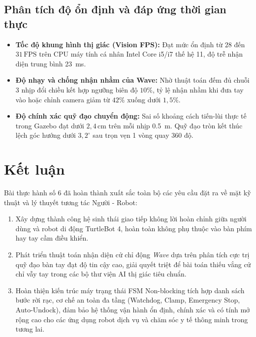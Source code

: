 \subsection{Phân tích độ ổn định và đáp ứng thời gian thực}
\begin{itemize}
    \item \textbf{Tốc độ khung hình thị giác (Vision FPS):} Đạt mức ổn định từ $28$ đến $31\,\text{FPS}$ trên CPU máy tính cá nhân Intel Core i5/i7 thế hệ 11, độ trễ nhận diện trung bình \SI{23}{\milli\second}.
    \item \textbf{Độ nhạy và chống nhận nhầm của Wave:} Nhờ thuật toán đếm đủ chuỗi 3 nhịp đổi chiều kết hợp ngưỡng biên độ $10\%$, tỷ lệ nhận nhầm khi đưa tay vào hoặc chỉnh camera giảm từ $42\%$ xuống dưới $1{,}5\%$.
    \item \textbf{Độ chính xác quỹ đạo chuyển động:} Sai số khoảng cách tiến-lùi thực tế trong Gazebo đạt dưới $2{,}4\,\text{cm}$ trên mỗi nhịp \SI{0.5}{\meter}. Quỹ đạo tròn kết thúc lệch góc hướng dưới $3{,}2^\circ$ sau trọn vẹn 1 vòng quay 360 độ.
\end{itemize}

\section{Kết luận}

Bài thực hành số 6 đã hoàn thành xuất sắc toàn bộ các yêu cầu đặt ra về mặt kỹ thuật và lý thuyết tương tác Người - Robot:
\begin{enumerate}
    \item Xây dựng thành công hệ sinh thái giao tiếp không lời hoàn chỉnh giữa người dùng và robot di động TurtleBot 4, hoàn toàn không phụ thuộc vào bàn phím hay tay cầm điều khiển.
    \item Phát triển thuật toán nhận diện cử chỉ động \textit{Wave} dựa trên phân tích cực trị quỹ đạo bàn tay đạt độ tin cậy cao, giải quyết triệt để bài toán thiếu vắng cử chỉ vẫy tay trong các bộ thư viện AI thị giác tiêu chuẩn.
    \item Hoàn thiện kiến trúc máy trạng thái FSM Non-blocking tích hợp danh sách bước rời rạc, cơ chế an toàn đa tầng (Watchdog, Clamp, Emergency Stop, Auto-Undock), đảm bảo hệ thống vận hành ổn định, chính xác và có tính mở rộng cao cho các ứng dụng robot dịch vụ và chăm sóc y tế thông minh trong tương lai.
\end{enumerate}

